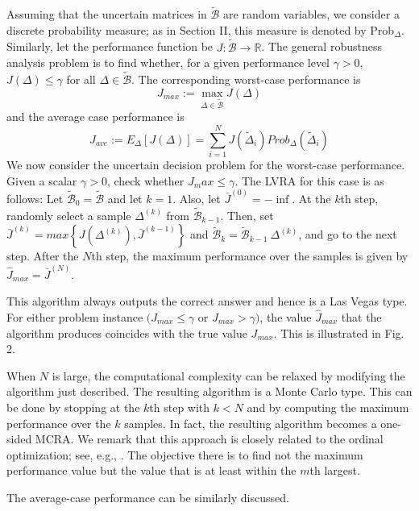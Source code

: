 \documentclass[12pt]{article}
\begin{document}
			Assuming that the uncertain matrices in $\tilde{\mathscr{B}}$ are random variables, we consider a discrete probability measure; as in Section II, this measure is denoted by Prob$_\Delta$. Similarly, let the performance function be $J : \tilde{\mathscr{B}} → \mathbb{R}$. The general robustness analysis problem is to find whether, for a given performance level $\gamma > 0$, $J(\Delta) \leq \gamma$ for all $\Delta \in \tilde{\mathscr{B}}$. The corresponding worst-case performance is
			\begin{equation}
				J_{max} := \max_{\Delta \in \tilde{\mathscr{B}}}J(\Delta)
			\end{equation}
			and the average case performance is
			\begin{equation*}
				J_{ave} := E_\Delta\left[J(\Delta)\right] = \sum_{i=1}^N J(\tilde{\Delta}_i)Prob_\Delta(\tilde{\Delta}_i)
			\end{equation*}
			We now consider the uncertain decision problem for the worst-case performance. Given a scalar $\gamma > 0$, check whether $J_max \leq \gamma$. The LVRA for this case is as follows: Let $\tilde{\mathscr{B}}_0 = \tilde{\mathscr{B}}$ and let $k = 1$. Also, let $\bar{J}^{(0)} = -\inf$. At the $k$th step, randomly select a sample $\Delta^{(k)}$ from $\tilde{\mathscr{B}}_{k-1}$. Then, set $\bar{J}^{(k)} = max \left\{J(\Delta^{(k)}), \bar{J}^{(k-1)}\right\}$ and $\tilde{\mathscr{B}}_k = \tilde{\mathscr{B}}_{k-1} \ {\Delta^{(k)}}$, and go to the next step. After the $N$th step, the maximum performance over the samples is given by $\hat{J}_{max} = \bar{J}^{(N)}$.
			\par
			This algorithm always outputs the correct answer and hence is a Las Vegas type. For either problem instance $(J_{max} \leq \gamma$ or $J_{max} > \gamma)$, the value \textbf{$\hat{J}_{max}$} that the algorithm produces coincides with the true value $J_{max}$. This is illustrated in Fig. 2.
			\par
			When $N$ is large, the computational complexity can be relaxed by modifying the algorithm just described. The resulting algorithm is a Monte Carlo type. This can be done by stopping at the $k$th step with $k < N$ and by computing the maximum performance over the $k$ samples. In fact, the resulting algorithm becomes a one-sided MCRA. We remark that this approach is closely related to the ordinal optimization; see, e.g., \cite{bib08}. The objective there is to find not the maximum performance value but the value that is at least within the $m$th largest.
			\par
			The average-case performance can be similarly discussed.			
			
\end{document}
